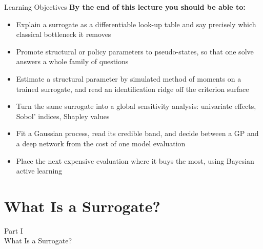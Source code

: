 \documentclass[aspectratio=169,11pt]{beamer}
\newcommand{\emphc}[1]{\textcolor{harvardcrimson}{#1}}
\begin{document}
\begin{frame}{Learning Objectives}
\textbf{By the end of this lecture you should be able to:}
\begin{itemize}\itemsep3pt
  \item Explain a surrogate as a \emphc{differentiable look-up table} and say precisely which classical bottleneck it removes
  \item Promote structural or policy parameters to \emphc{pseudo-states}, so that one solve answers a whole family of questions
  \item Estimate a structural parameter by simulated method of moments on a trained surrogate, and read an identification ridge off the criterion surface
  \item Turn the same surrogate into a global sensitivity analysis: univariate effects, Sobol' indices, Shapley values
  \item Fit a Gaussian process, read its credible band, and \emphc{decide between a GP and a deep network} from the cost of one model evaluation
  \item Place the next expensive evaluation where it buys the most, using Bayesian active learning
\end{itemize}
\end{frame}


\section{What Is a Surrogate?}

\begin{frame}{}
\begin{center}
{\Huge \textcolor{uzhblue}{Part I}}\\[0.8em]
{\LARGE What Is a Surrogate?}
\end{center}
\end{frame}
\end{document}
